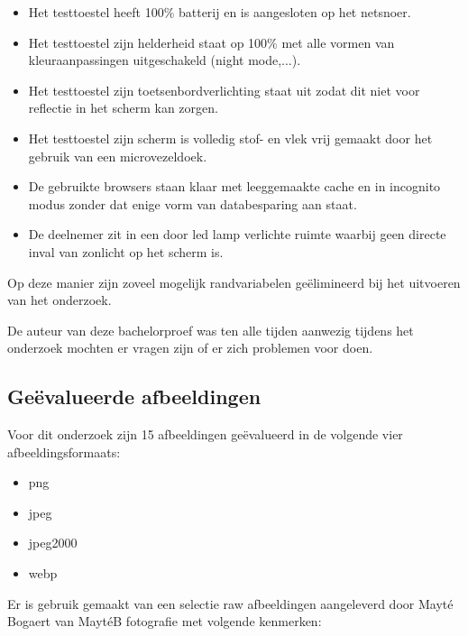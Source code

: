 \begin{itemize}
	\item Het testtoestel heeft 100\% batterij en is aangesloten op het netsnoer.
	
	\item Het testtoestel zijn helderheid staat op 100\% met alle vormen van kleuraanpassingen uitgeschakeld (night mode,...).
	
	\item Het testtoestel zijn toetsenbordverlichting staat uit zodat dit niet voor reflectie in het scherm kan zorgen.
	
	\item Het testtoestel zijn scherm is volledig stof- en vlek vrij gemaakt door het gebruik van een microvezeldoek.
	
	\item De gebruikte browsers staan klaar met leeggemaakte cache en in incognito modus zonder dat enige vorm van databesparing aan staat.
	
	\item De deelnemer zit in een door led lamp verlichte ruimte waarbij geen directe inval van zonlicht op het scherm is.
\end{itemize}

Op deze manier zijn zoveel mogelijk randvariabelen geëlimineerd bij het uitvoeren van het onderzoek.

De auteur van deze bachelorproef was ten alle tijden aanwezig tijdens het onderzoek mochten er vragen zijn of er zich problemen voor doen.

\subsection{Geëvalueerde afbeeldingen}
\label{sec:onderzoek-uitvoering-afbeeldingsformaten}

Voor dit onderzoek zijn 15 afbeeldingen geëvalueerd in de volgende vier \glspl{afbeeldingsformaat}: 

\begin{itemize}
	\item \gls{png}
	
	\item \gls{jpeg}
	
	\item \gls{jpeg2000}
	
	\item \gls{webp}
\end{itemize}

Er is gebruik gemaakt van een selectie \gls{raw} afbeeldingen aangeleverd door Mayté Bogaert van MaytéB fotografie met volgende kenmerken:

